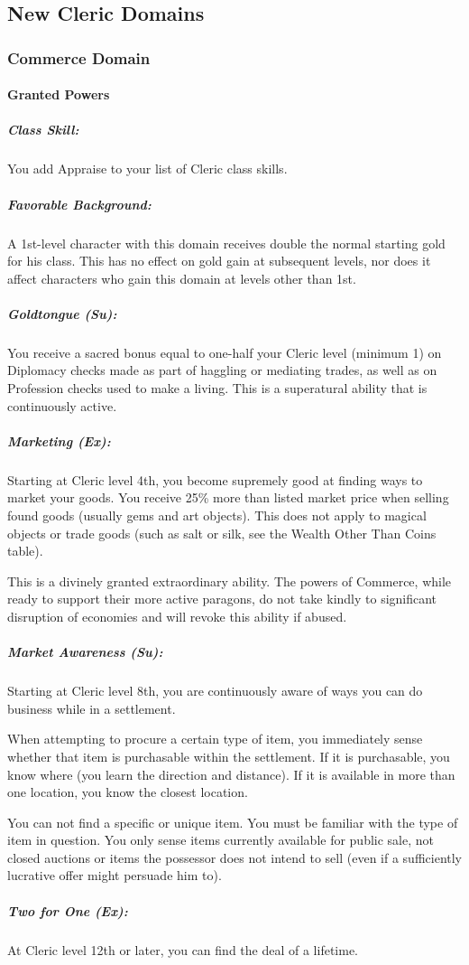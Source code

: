 \subsection{New Cleric Domains}
\label{sec:NewClericDomains}
\subsubsection{Commerce Domain}
\label{sec:CommerceDomain}
\paragraph{Granted Powers}
\subparagraph{Class Skill:}
You add Appraise to your list of Cleric class skills.
\subparagraph{Favorable Background:} A 1st-level character with this domain receives double the normal starting gold for his class. This has no effect on gold gain at subsequent levels, nor does it affect characters who gain this domain at levels other than 1st.
\subparagraph{Goldtongue (Su):}
You receive a sacred bonus equal to one-half your Cleric level (minimum 1) on Diplomacy checks made as part of haggling or mediating trades, as well as on Profession checks used to make a living.
This is a superatural ability that is continuously active.
\subparagraph{Marketing (Ex):}
Starting at Cleric level 4th, you become supremely good at finding ways to market your goods. You receive 25\% more than listed market price when selling found goods (usually gems and art objects). This does not apply to magical objects or trade goods (such as salt or silk, see the Wealth Other Than Coins table).

This is a divinely granted extraordinary ability. The powers of Commerce, while ready to support their more active paragons, do not take kindly to significant disruption of economies and will revoke this ability if abused.
\subparagraph{Market Awareness (Su):}
Starting at Cleric level 8th, you are continuously aware of ways you can do business while in a settlement.

When attempting to procure a certain type of item, you immediately sense whether that item is purchasable within the settlement.
If it is purchasable, you know where (you learn the direction and distance). If it is available in more than one location, you know the closest location.

You can not find a specific or unique item. You must be familiar with the type of item in question. You only sense items currently available for public sale, not closed auctions or items the possessor does not intend to sell (even if a sufficiently lucrative offer might persuade him to).
\subparagraph{Two for One (Ex):}
At Cleric level 12th or later, you can find the deal of a lifetime.

